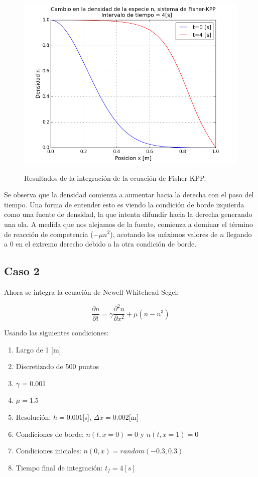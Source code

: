 \documentclass{article}
\begin{document}
\begin{figure}[ht]
  \centering
  \includegraphics[scale = 0.55]{images/resultados_p1.png}
  \label{fig:resultados_p1}
  \caption{Resultados de la integración de la ecuación de Fisher-KPP.}
\end{figure}

Se observa que la densidad comienza a aumentar hacia la derecha con el paso del tiempo. Una forma de entender esto es viendo la condición de borde izquierda como una fuente de densidad, la que intenta difundir hacia la derecha generando una ola. A medida que nos alejamos de la fuente, comienza a dominar el término de reacción de competencia ($-\mu n^2$), acotando los máximos valores de $n$ llegando a 0 en el extremo derecho debido a la otra condición de borde.

\subsection{Caso 2}

Ahora se integra la ecuación de Newell-Whitehead-Segel:

\begin{equation}
  \frac{\partial n}{\partial t} = \gamma \frac{\partial^2n}{\partial x^2} + \mu ( n - n^3 )
\end{equation}

Usando las siguientes condiciones:

\begin{enumerate}
  \item Largo de 1 [m]
  \item Discretizado de 500 puntos
  \item $\gamma$ = 0.001
  \item $\mu  = 1.5$
  \item Resolución: $h = 0.001$[s], $\Delta x = 0.002$[m]
  \item Condiciones de borde: $n(t, x=0) = 0$ y $n(t, x=1) = 0$
  \item Condiciones iniciales: $ n(0, x) = random(-0.3,0.3) $
  \item Tiempo final de integración: $t_f = 4[s]$
\end{enumerate}
\end{document}
